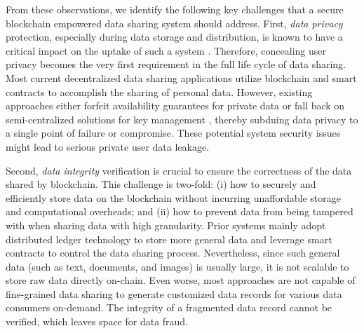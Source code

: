 \documentclass[11pt,divpdfm]{article}
\begin{document}
From these observations, we identify the following key challenges that a secure blockchain empowered data sharing system should address.
First, \emph{data privacy} protection, especially during data storage and distribution, is known to have a critical impact on the uptake of such a system \cite{salman2018security}.
Therefore, concealing user privacy becomes the very first requirement in the full life cycle of data sharing.
Most current decentralized data sharing applications \cite{shen2019medchain, kang2018blockchain} utilize blockchain and smart contracts to accomplish the sharing of personal data.
However, existing approaches either forfeit availability guarantees for private data \cite{liang2017integrating} or fall back on semi-centralized solutions for key management \cite{cheng2020design, zyskind2015decentralizing}, thereby subduing data privacy to a single point of failure or compromise.
These potential system security issues might lead to serious private user data leakage.

Second, \emph{data integrity} verification is crucial to ensure the correctness of the data shared by blockchain.
This challenge is two-fold:
(i) how to securely and efficiently store data on the blockchain without incurring unaffordable storage and computational overheads;
and (ii) how to prevent data from being tampered with when sharing data with high granularity.
Prior systems \cite{matzutt2018quantitative, fan2018medblock, su2020lvbs} mainly adopt distributed ledger technology to store more general data and leverage smart contracts to control the data sharing process.
Nevertheless, since such general data (such as text, documents, and images) is usually large, it is not scalable to store raw data directly on-chain.
Even worse, most approaches are not capable of fine-grained data sharing to generate customized data records for various data consumers on-demand.
The integrity of a fragmented data record cannot be verified, which leaves space for data fraud.
\end{document}
